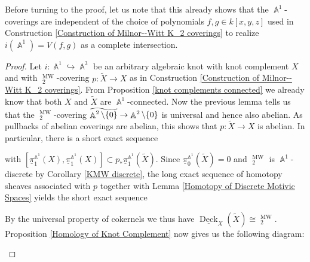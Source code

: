 \documentclass[english]{amsart}
\theoremstyle{definition}
\newcommand\reallywidetilde[1]{\ThisStyle{%
  \setbox0=\hbox{$\SavedStyle#1$}%
  \stackengine{-.1\LMpt}{$\SavedStyle#1$}{%
    \stretchto{\scaleto{\SavedStyle\mkern.2mu\AC}{.5150\wd0}}{.4\ht0}%
  }{O}{c}{F}{T}{S}%
}}
\DeclareMathOperator{\A}{\mathbb{A}}
\DeclareMathOperator{\Deck}{Deck}
\DeclareMathOperator{\KK}{\underline{K}}
\DeclareMathOperator{\MW}{MW}
\begin{document}
Before turning to the proof, let us note that this already shows that the $ \A^1$-coverings are independent of the choice of polynomials $f,g \in k[x,y,z]$ used in Construction \ref{Construction of Milnor--Witt K_2 coverings} to realize $i(\A^1) = V(f,g)$ as a complete intersection.
\begin{proof}
Let $i \colon \A^1 \hookrightarrow \A^3$ be an arbitrary algebraic knot with knot complement $X$ and with $\KK^{\MW}_2$-covering $p \colon \widetilde{X} \rightarrow X$ as in Construction \ref{Construction of Milnor--Witt K_2 coverings}. From Proposition \ref{knot complements connected} we already know that both $X$ and $\widetilde{X}$ are $\A^1$-connected. Now the previous lemma tells us that the $\KK^{\MW}_2$-covering $\reallywidetilde{\A^2 \setminus \lbrace 0 \rbrace} \rightarrow \A^2 \setminus \lbrace 0 \rbrace$ is universal and hence also abelian. As pullbacks of abelian coverings are abelian, this shows that $p \colon \widetilde{X} \rightarrow X$ is abelian. In particular, there is a short exact sequence
\begin{center}
\end{center}
with $[\underline{\pi}_1^{\A^1}\!(X),\underline{\pi}_1^{\A^1}\!(X)] \subset p_*\underline{\pi}_1^{\A^1}\!(\widetilde{X})$. Since $\underline{\pi}_0^{\A^1}\!(\widetilde{X}) = 0$ and $\KK^{\MW}_2$ is $\A^1$-discrete by Corollary \ref{KMW discrete}, the long exact sequence of homotopy sheaves associated with $p$ together with Lemma \ref{Homotopy of Discrete Motivic Spaces} yields the short exact sequence
\begin{center}
\end{center}
By the universal property of cokernels we thus have $\underline{\Deck}_X(\widetilde{X}) \cong \KK^{\MW}_2$. Proposition \ref{Homology of Knot Complement} now gives us the following diagram:
\begin{center}
\end{center}
\end{proof}
\end{document}
